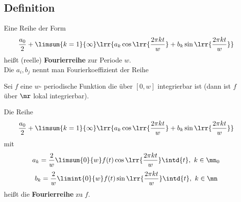 \subsection{Definition}
	\item Eine Reihe der Form
	\[\dfrac{a_0}{2}+\limsum{k=1}{\infty}\lrr{a_k\cos\lrr{\frac{2\pi kt}{w}}+b_k\sin\lrr{\dfrac{2\pi kt}{w}}}\]
	heißt (reelle) \textbf{Fourierreihe} zur Periode $ w $.\\
	Die $ a_i,b_j $ nennt man Fourierkoeffizient der Reihe
	\item Sei $ f $ eine $ w $- periodische Funktion die über $ [0,w] $ integrierbar ist (dann ist $ f $ über $ \mr $ lokal integrierbar).
	
	Die Reihe
	\[\dfrac{a_0}{2}+\limsum{k=1}{\infty}\lrr{a_k\cos\lrr{\frac{2\pi kt}{w}}+b_k\sin\lrr{\dfrac{2\pi kt}{w}}}\]
	mit
	\[a_k=\frac{2}{w}\limsum{0}{w}f(t)\cos\lrr{\dfrac{2\pi kt}{w}}\intd{t},\ k\in\mn_0\]
	\[b_k=\frac{2}{w}\limint{0}{w}f(t)\sin\lrr{\dfrac{2\pi kt}{w}}\intd{t},\ k\in\mn\]
	heißt die \textbf{Fourierreihe} zu $ f $.
	\subExEnd